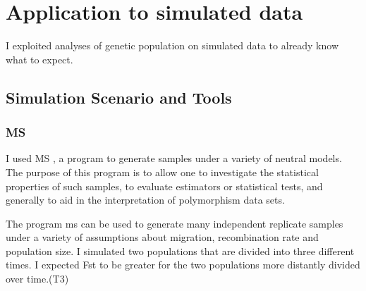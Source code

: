 
\section{Application to simulated data}
I exploited analyses of genetic population on simulated data to already know what to expect.



\subsection{Simulation Scenario and Tools}

\subsubsection{MS}

I used MS \cite{hudson2004ms}, a program to generate samples under a variety of neutral models. The purpose of this program is to allow one to investigate the statistical properties of such samples, to evaluate estimators or statistical tests, and generally to aid in the interpretation of polymorphism data sets.

The program ms can be used to generate many independent replicate samples under a variety of assumptions about migration, recombination rate and population size. I simulated two populations that are divided into three different times. I expected Fst to be greater for the two populations more distantly divided over time.(T3)





